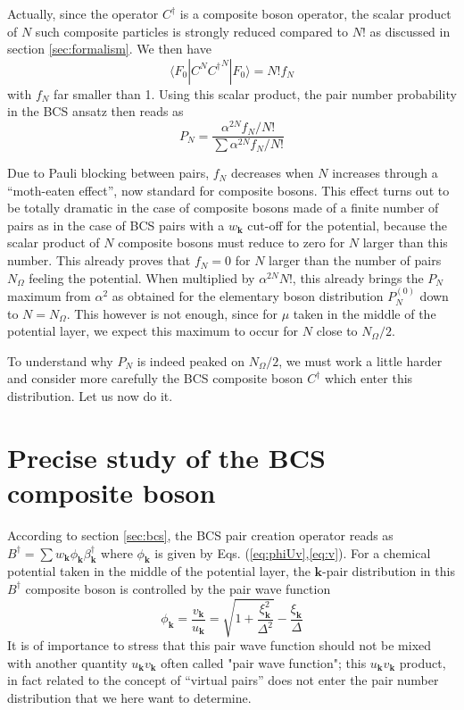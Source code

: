 \documentclass[aps,prb,preprint,groupedaddress,amsmath]{revtex4-1}
\newcommand{\vk}{\ensuremath{\mathbf{k}}}
\newcommand{\dg}{\ensuremath{\dagger}}
\begin{document}
Actually,  since the operator $C^\dg$ is a composite boson operator, the scalar product of $N$ such composite particles is strongly reduced compared to $N!$ as discussed in section \ref{sec:formalism}.  We then have 
\begin{equation}
\langle{}F_0|{C}^N{C^\dg}^N|F_0{\rangle}=N!f_N
\end{equation}
with $f_N$ far smaller than 1.  Using this scalar product, the pair number probability in the BCS ansatz then reads as
\begin{equation}
P_N=\frac{\alpha^{2N}f_N/N!}{\sum\alpha^{2N}f_N/N!}
\end{equation}

Due to  Pauli blocking between pairs,  $f_N$ decreases when $N$ increases through a ``moth-eaten effect'', now standard for composite bosons. This effect turns out to be totally dramatic in the case of composite bosons made of a finite number of pairs as in the case of BCS pairs with a $w_\vk$ cut-off for the potential, because the scalar product of $N$ composite bosons must reduce to zero for $N$ larger than this number.  This already proves that $f_N=0$ for $N$ larger than the number of pairs $N_\Omega$ feeling the potential.  When multiplied by $\alpha^{2N}N!$, this already brings the $P_N$ maximum from $\alpha^2$ as obtained for the elementary boson distribution $P_N^{(0)}$ down to $N=N_\Omega$. This however is not enough, since   for $\mu$ taken in the middle of the potential layer, we expect this maximum to occur for $N$ close to $N_\Omega/2$.

To understand why $P_N$ is indeed peaked on $N_\Omega/2$, we must work a little harder and consider more carefully the BCS composite boson $C^\dg$ which enter this distribution.  Let us now do it.  
\section{Precise study of the BCS composite boson}
According to section \ref{sec:bcs}, the BCS pair creation operator reads as  $B^\dg=\sum{}w_\vk\phi_\vk\beta^\dg_\vk$ where $\phi_\vk$ is given by Eqs. (\ref{eq:phiUv},\ref{eq:v}).  For a chemical potential taken in the middle of the potential layer, the $\vk$-pair distribution in this  $B^\dg$ composite boson is  controlled by the pair wave function
\begin{equation}
\phi_\vk=\frac{v_\vk}{u_\vk}=\sqrt{1+\frac{\xi_\vk^2}{\Delta^2}}-\frac{\xi_\vk}{\Delta}
\end{equation}
It is of importance to stress that this pair wave function should not be mixed with another quantity $u_\vk{}v_\vk$ often called "pair wave function"; this $u_\vk{}v_\vk$ product, in fact related to the concept of ``virtual pairs'' does not enter the pair number distribution that we here want to determine.   
\end{document}
